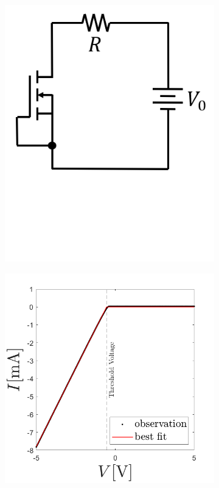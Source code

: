 \documentclass[%
 aip,
amsmath,amssymb,
reprint,
]{revtex4-1}
\begin{document}
\begin{figure}[!htbp]
  \begin{subfigure}{0.15\textwidth}
    \includegraphics[width=\linewidth]{figures/MOSFET_circuit.png}
    \caption{}
    \label{MOSFET_circuitfig_a}
  \end{subfigure}%
  \begin{subfigure}{0.23\textwidth}
    \includegraphics[width=\linewidth]{figures/MOSFETIV.png}
    \caption{}
    \label{MOSFET_circuitfig_b}
  \end{subfigure}


\end{figure}
\end{document}
